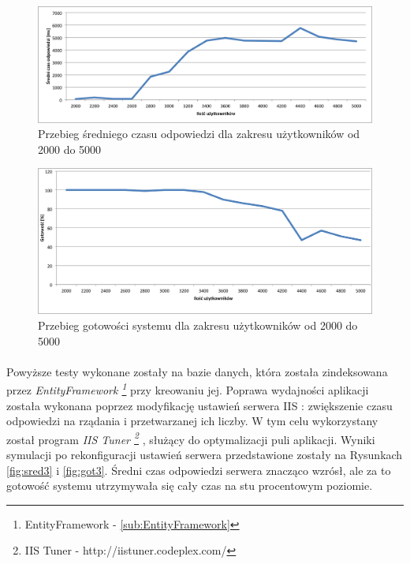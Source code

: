 \begin{figure}[ht]
	\centering
		\includegraphics[width=1\linewidth]{assets/sredni2.png}
		\caption{Przebieg średniego czasu odpowiedzi dla zakresu użytkowników od 2000 do 5000}
	\label{fig:sred2}
\end{figure}

\begin{figure}[ht]
	\centering
		\includegraphics[width=1\linewidth]{assets/gotowosc2.png}
		\caption{Przebieg gotowości systemu dla zakresu użytkowników od 2000 do 5000}
	\label{fig:got2}
\end{figure}

\paragraph{} %
\label{par:}
Powyższe testy wykonane zostały na bazie danych, która została zindeksowana przez \textit{EntityFramework \footnote{EntityFramework - \ref{sub:EntityFramework}}} przy kreowaniu jej. Poprawa wydajności aplikacji została wykonana poprzez modyfikację ustawień serwera IIS : zwiększenie czasu odpowiedzi na rządania i przetwarzanej ich liczby. W tym celu wykorzystany został program \textit{IIS Tuner \footnote{IIS Tuner - http://iistuner.codeplex.com/}} , służący do optymalizacji puli aplikacji. Wyniki symulacji po rekonfiguracji ustawień serwera przedstawione zostały na Rysunkach \ref{fig:sred3} i \ref{fig:got3}. Średni czas odpowiedzi serwera znacząco wzrósł, ale za to gotowość systemu utrzymywała się cały czas na stu procentowym poziomie.

